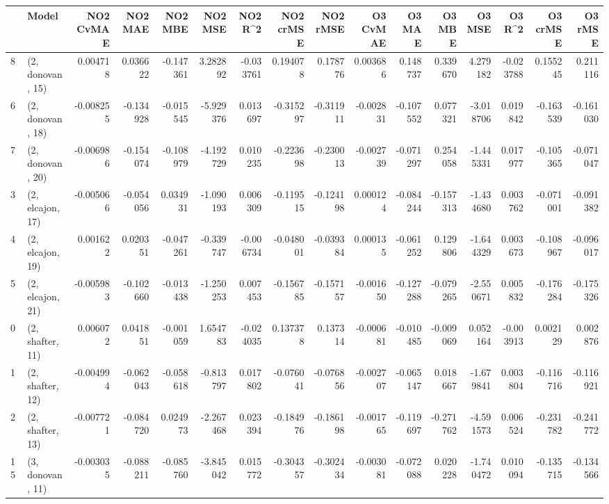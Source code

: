\begin{tabular}{llrrrrrrrrrrrrrr}
\toprule
{} &             Model &  NO2 CvMAE &   NO2 MAE &   NO2 MBE &    NO2 MSE &   NO2 R\textasciicircum2 &  NO2 crMSE &  NO2 rMSE &  O3 CvMAE &    O3 MAE &    O3 MBE &     O3 MSE &    O3 R\textasciicircum2 &  O3 crMSE &   O3 rMSE \\
\midrule
8  &  (2, donovan, 15) &   0.004718 &  0.036622 & -0.147361 &   3.282892 & -0.033761 &   0.194078 &  0.178776 &  0.003686 &  0.148737 &  0.339670 &   4.279182 & -0.023788 &  0.155245 &  0.211116 \\
6  &  (2, donovan, 18) &  -0.008255 & -0.134928 & -0.015545 &  -5.929376 &  0.013697 &  -0.315297 & -0.311911 & -0.002831 & -0.107552 &  0.077321 &  -3.018706 &  0.019842 & -0.163539 & -0.161030 \\
7  &  (2, donovan, 20) &  -0.006986 & -0.154074 & -0.108979 &  -4.192729 &  0.010235 &  -0.223698 & -0.230013 & -0.002739 & -0.071297 &  0.254058 &  -1.445331 &  0.017977 & -0.105365 & -0.071047 \\
3  &  (2, elcajon, 17) &  -0.005066 & -0.054056 &  0.034931 &  -1.090193 &  0.006309 &  -0.119515 & -0.124198 &  0.000124 & -0.084244 & -0.157313 &  -1.434680 &  0.003762 & -0.071001 & -0.091382 \\
4  &  (2, elcajon, 19) &   0.001622 &  0.020351 & -0.047261 &  -0.339747 & -0.006734 &  -0.048001 & -0.039384 &  0.000135 & -0.061252 &  0.129806 &  -1.644329 &  0.003673 & -0.108967 & -0.096017 \\
5  &  (2, elcajon, 21) &  -0.005983 & -0.102660 & -0.013438 &  -1.250253 &  0.007453 &  -0.156785 & -0.157157 & -0.001650 & -0.127288 & -0.079265 &  -2.550671 &  0.005832 & -0.176284 & -0.175326 \\
0  &  (2, shafter, 11) &   0.006072 &  0.041851 & -0.001059 &   1.654783 & -0.024035 &   0.137378 &  0.137314 & -0.000681 & -0.010485 & -0.009069 &   0.052164 & -0.003913 &  0.002129 &  0.002876 \\
1  &  (2, shafter, 12) &  -0.004994 & -0.062043 & -0.058618 &  -0.813797 &  0.017802 &  -0.076041 & -0.076856 & -0.002707 & -0.065147 &  0.018667 &  -1.679841 &  0.003804 & -0.116716 & -0.116921 \\
2  &  (2, shafter, 13) &  -0.007721 & -0.084720 &  0.024973 &  -2.267468 &  0.023394 &  -0.184976 & -0.186198 & -0.001765 & -0.119697 & -0.271762 &  -4.591573 &  0.006524 & -0.231782 & -0.241772 \\
15 &  (3, donovan, 11) &  -0.003035 & -0.088211 & -0.085760 &  -3.845042 &  0.015772 &  -0.304357 & -0.302434 & -0.003081 & -0.072088 &  0.020228 &  -1.740472 &  0.010094 & -0.135715 & -0.134566 \\

\end{tabular}
